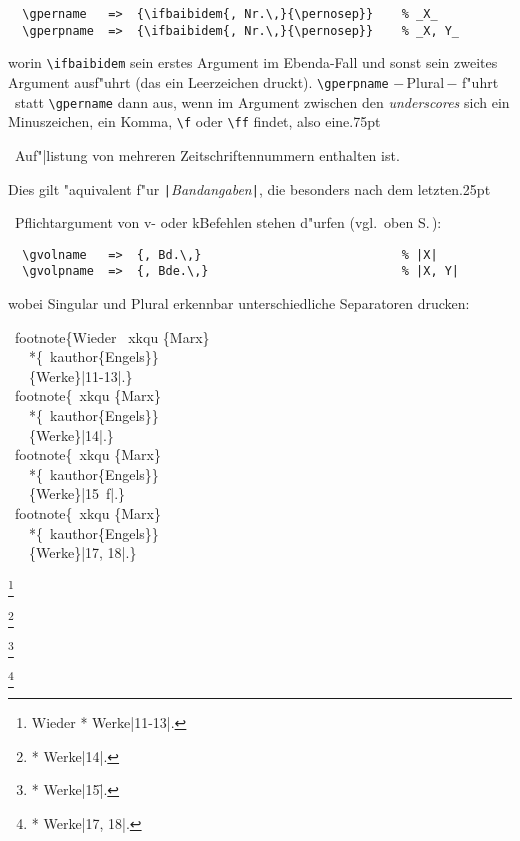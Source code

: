 \documentclass[12pt,a4paper]{article}
\newcommand{\pdfko}[1]{\kern #1pt
                          \strut\ignorespaces}%
\newcommand{\pbs}{\string\ \unskip}
\newcommand{\bs}{\protect\pbs}
\begin{document}
\vspace{-1ex}
{\small
\begin{verbatim}
  \gpername   =>  {\ifbaibidem{, Nr.\,}{\pernosep}}    % _X_
  \gperpname  =>  {\ifbaibidem{, Nr.\,}{\pernosep}}    % _X, Y_
\end{verbatim}}\label{pernosep}

\vspace{-.75ex}\noindent
worin \verb|\ifbaibidem| sein erstes Argument im Ebenda-Fall und
sonst sein zweites Argument ausf"uhrt (das ein Leerzeichen druckt). 
\verb|\gperpname| $-$\,Plural\,$-$ f"uhrt
\BibArts\ statt \verb|\gpername| dann aus, wenn im Argument zwischen
den \textit{underscores} sich ein Minuszeichen, ein Komma, \verb|\f|
oder \verb|\ff| findet, also eine\pdfko{.75}\ 
Auf"|listung von mehreren Zeitschriftennummern enthalten ist. 

Dies gilt "aquivalent f"ur \verb+|+\ko\textit{Bandangaben}\ko\verb+|+, 
die besonders nach dem letzten\pdfko{.25}\ Pflichtargument von 
v- oder k\fhy Befehlen stehen d"urfen (vgl.\ oben S.\,\pageref{Reinhard}):

\vspace{-1ex}
{\small
\begin{verbatim}
  \gvolname   =>  {, Bd.\,}                            % |X|
  \gvolpname  =>  {, Bde.\,}                           % |X, Y|
\end{verbatim}}

\vspace{-.75ex}\noindent
wobei Singular und Plural erkennbar unterschiedliche Separatoren drucken:

\vfill
\Doppelbox
{\vspace{.75ex}%
  \bs footnote\{Wieder \bs xkqu \{Marx\} 
\\[-1pt] \ \ \ *\{\bs kauthor\{Engels\}\} 
\\[-1pt] \ \ \ \{Werke\}\string|11-13\string|.\}
\\[3pt] \bs footnote\{\bs xkqu \{Marx\} 
\\[-1pt] \ \ \ *\{\bs kauthor\{Engels\}\} 
\\[-1pt] \ \ \ \{Werke\}\string|14\string|.\}
\\[3pt] \bs footnote\{\bs xkqu \{Marx\} 
\\[-1pt] \ \ \ *\{\bs kauthor\{Engels\}\} 
\\[-1pt] \ \ \ \{Werke\}\string|15\bs f\string|.\}
\\[3pt] \bs footnote\{\bs xkqu \{Marx\} 
\\[-1pt] \ \ \ *\{\bs kauthor\{Engels\}\} 
\\[-1pt] \ \ \ \{Werke\}\string|17, 18\string|.\}
\vspace{.75ex}%
}
{
\footnote{Wieder  *{} {Werke}|11-13|.}

\footnote{ *{} {Werke}|14|.}

\footnote{ *{} {Werke}|15\f|.}

\footnote{ *{} {Werke}|17, 18|.}
}
\end{document}

